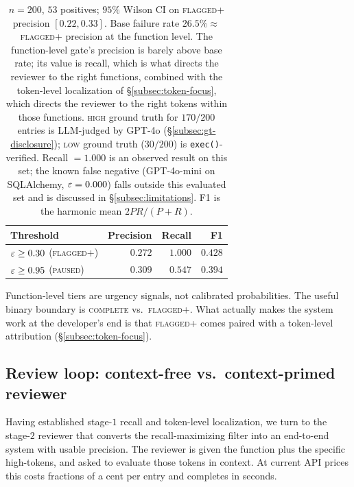 \begin{table}[h]
\centering
\small
\begin{tabular}{lrrr}
\toprule
Threshold & Precision & Recall & F1 \\
\midrule
$\varepsilon \ge 0.30$ (\textsc{flagged+}) & $0.272$ & $\mathbf{1.000}$ & $0.428$ \\
$\varepsilon \ge 0.95$ (\textsc{paused})   & $\mathbf{0.309}$ & $0.547$ & $0.394$ \\
\bottomrule
\end{tabular}
\caption{$n=200$, $53$ positives; $95\%$ Wilson CI on
\textsc{flagged+} precision $[0.22, 0.33]$. Base failure rate
$26.5\% \approx$ \textsc{flagged+} precision at the function level.
The function-level gate's precision is barely above base rate; its
value is recall, which is what directs the reviewer to the right
functions, combined with the token-level localization of
\S\ref{subsec:token-focus}, which directs the reviewer to the right
tokens within those functions. \textsc{high} ground truth for
$170/200$ entries is LLM-judged by GPT-4o
(\S\ref{subsec:gt-disclosure}); \textsc{low} ground truth ($30/200$)
is \texttt{exec()}-verified.
Recall $=1.000$ is an observed result on this set; the known false
negative (GPT-4o-mini on SQLAlchemy, $\varepsilon=0.000$) falls outside
this evaluated set and is discussed in \S\ref{subsec:limitations}.
F1 is the harmonic mean $2PR/(P+R)$.}
\label{tab:pr}
\end{table}

Function-level tiers are urgency signals, not calibrated
probabilities. The useful binary boundary is \textsc{complete} vs.\
\textsc{flagged+}. What actually makes the system work at the
developer's end is that \textsc{flagged+} comes paired with a
token-level attribution (\S\ref{subsec:token-focus}).

\subsection{Review loop: context-free vs.\ context-primed reviewer}
\label{subsec:review-loop}

Having established stage-$1$ recall and token-level localization, we
turn to the stage-$2$ reviewer that converts the recall-maximizing
filter into an end-to-end system with usable precision. The reviewer
is given the function plus the specific high-\eps tokens, and asked
to evaluate those tokens in context. At current API prices this
costs fractions of a cent per entry and completes in seconds.

